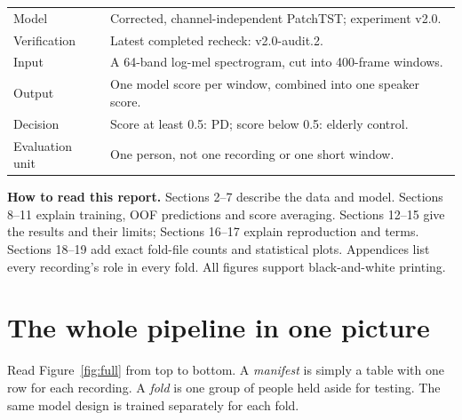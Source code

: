 \documentclass[11pt,a4paper]{article}
\newcommand{\key}[1]{\textbf{#1}}
\begin{document}
\begin{center}
\begin{tabularx}{\linewidth}{@{}L{3.3cm}Y@{}}
\toprule
Model & Corrected, channel-independent PatchTST; experiment v2.0.\\
Verification & Latest completed recheck: v2.0-audit.2.\\
Input & A 64-band log-mel spectrogram, cut into 400-frame windows.\\
Output & One model score per window, combined into one speaker score.\\
Decision & Score at least 0.5: PD; score below 0.5: elderly control.\\
Evaluation unit & One person, not one recording or one short window.\\
\bottomrule
\end{tabularx}
\end{center}

\key{How to read this report.} Sections 2--7 describe the data and model.
Sections 8--11 explain training, OOF predictions and score averaging.
Sections 12--15 give the results and their limits; Sections 16--17 explain
reproduction and terms. Sections 18--19 add exact fold-file counts and statistical
plots. Appendices list every recording's role in every fold. All figures support
black-and-white printing.

\clearpage
\section{The whole pipeline in one picture}
Read Figure~\ref{fig:full} from top to bottom. A \emph{manifest} is simply a table
with one row for each recording. A \emph{fold} is one group of people held aside
for testing. The same model design is trained separately for each fold.
\end{document}
